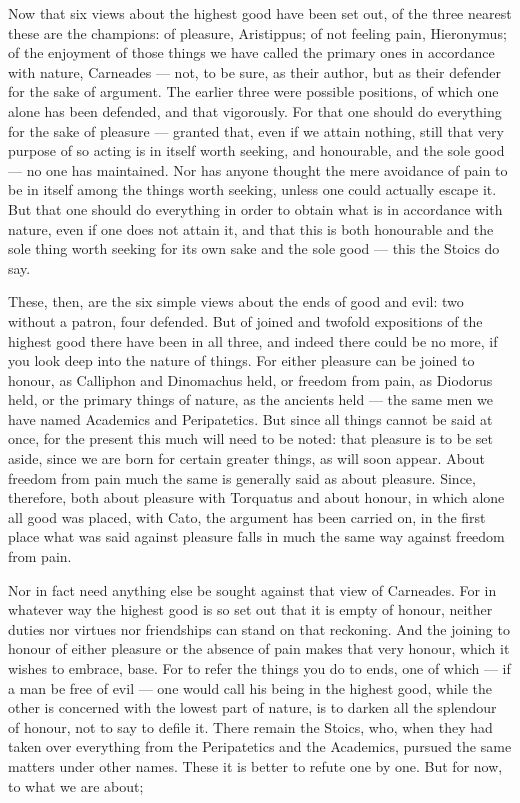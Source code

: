  Now that six views about the highest good have been set out, of the three nearest these are the champions: of pleasure, Aristippus; of not feeling pain, Hieronymus; of the enjoyment of those things we have called the primary ones in accordance with nature, Carneades — not, to be sure, as their author, but as their defender for the sake of argument. The earlier three were possible positions, of which one alone has been defended, and that vigorously. For that one should do everything for the sake of pleasure — granted that, even if we attain nothing, still that very purpose of so acting is in itself worth seeking, and honourable, and the sole good — no one has maintained. Nor has anyone thought the mere avoidance of pain to be in itself among the things worth seeking, unless one could actually escape it. But that one should do everything in order to obtain what is in accordance with nature, even if one does not attain it, and that this is both honourable and the sole thing worth seeking for its own sake and the sole good — this the Stoics do say.

 These, then, are the six simple views about the ends of good and evil: two without a patron, four defended. But of joined and twofold expositions of the highest good there have been in all three, and indeed there could be no more, if you look deep into the nature of things. For either pleasure can be joined to honour, as Calliphon and Dinomachus held, or freedom from pain, as Diodorus held, or the primary things of nature, as the ancients held — the same men we have named Academics and Peripatetics. But since all things cannot be said at once, for the present this much will need to be noted: that pleasure is to be set aside, since we are born for certain greater things, as will soon appear. About freedom from pain much the same is generally said as about pleasure. Since, therefore, both about pleasure with Torquatus and about honour, in which alone all good was placed, with Cato, the argument has been carried on, in the first place what was said against pleasure falls in much the same way against freedom from pain.

 Nor in fact need anything else be sought against that view of Carneades. For in whatever way the highest good is so set out that it is empty of honour, neither duties nor virtues nor friendships can stand on that reckoning. And the joining to honour of either pleasure or the absence of pain makes that very honour, which it wishes to embrace, base. For to refer the things you do to ends, one of which — if a man be free of evil — one would call his being in the highest good, while the other is concerned with the lowest part of nature, is to darken all the splendour of honour, not to say to defile it. There remain the Stoics, who, when they had taken over everything from the Peripatetics and the Academics, pursued the same matters under other names. These it is better to refute one by one. But for now, to what we are about;

